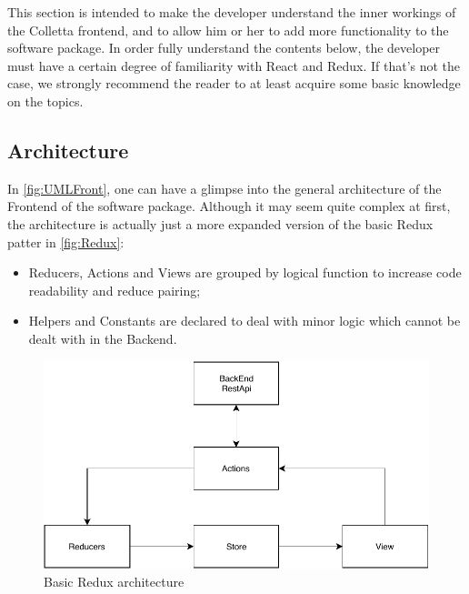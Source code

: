 This section is intended to make the developer understand the inner workings of the Colletta frontend, and to allow him or her to add more functionality to the software package.
In order fully understand the contents below, the developer must have a certain degree of familiarity with React and Redux. If that's not the case, we strongly recommend the reader to at least acquire some basic knowledge on the topics.
\subsection{Architecture}
\label{sec:FrontArchi}
In \autoref{fig:UMLFront}, one can have a glimpse into the general architecture of the Frontend of the software package.
Although it may seem quite complex at first, the architecture is actually just a more expanded version of the basic Redux patter in \autoref{fig:Redux}:
\begin{itemize}
	\item Reducers, Actions and Views are grouped by logical function to increase code readability and reduce pairing;
	\item Helpers and Constants are declared to deal with minor logic which cannot be dealt with in the Backend.
\end{itemize}

\begin{figure}
\centering 
\includegraphics[width=12cm]{uml/Flux.pdf} 
\caption{Basic Redux architecture}
\label{fig:Redux}
\end{figure}

